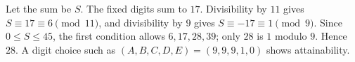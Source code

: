 Let the sum be $S$. The fixed digits sum to $17$. Divisibility by $11$ gives $S\equiv17\equiv6\pmod{11}$, and divisibility by $9$ gives $S\equiv-17\equiv1\pmod9$. Since $0\le S\le45$, the first condition allows $6,17,28,39$; only $28$ is $1$ modulo $9$. Hence $\boxed{28}$. A digit choice such as $(A,B,C,D,E)=(9,9,9,1,0)$ shows attainability.
